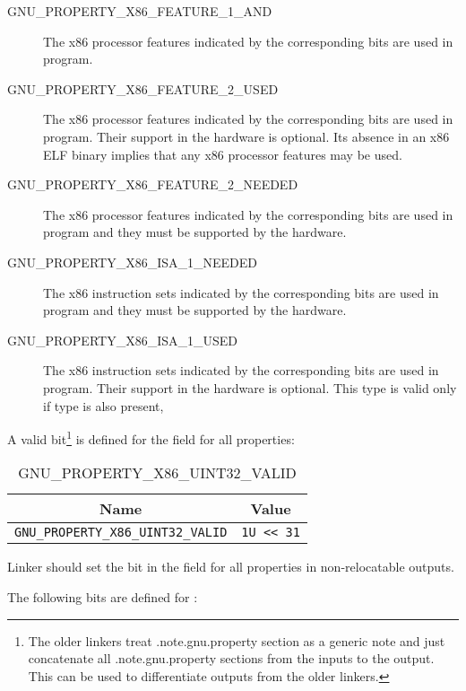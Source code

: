 \begin{description}
 \item[GNU_PROPERTY_X86_FEATURE_1_AND] The x86 processor features
   indicated by the corresponding bits are used in program.
 \item[GNU_PROPERTY_X86_FEATURE_2_USED] The x86 processor features
   indicated by the corresponding bits are used in program.  Their
   support in the hardware is optional.  Its absence in an x86 ELF
   binary implies that any x86 processor features may be used.
 \item[GNU_PROPERTY_X86_FEATURE_2_NEEDED] The x86 processor features
   indicated by the corresponding bits are used in program and they
   must be supported by the hardware.
 \item[GNU_PROPERTY_X86_ISA_1_NEEDED] The x86 instruction sets indicated
   by the corresponding bits are used in program and they must be
   supported by the hardware.
 \item[GNU_PROPERTY_X86_ISA_1_USED] The x86 instruction sets indicated
   by the corresponding bits are used in program.  Their support in the
   hardware is optional.  This type is valid only if
    type is also present,
\end{description}

A valid bit\footnote{The older linkers treat .note.gnu.property section
as a generic note and just concatenate all .note.gnu.property sections
from the inputs to the output. This can be used to differentiate outputs
from the older linkers.} is defined for the  field for all
properties:

\begin{table}[H]
\Hrule
  \caption{GNU_PROPERTY_X86_UINT32_VALID}
  \begin{center}
    \begin{tabular}[t]{l|l}
      \multicolumn{1}{c}{Name} & \multicolumn{1}{c}{Value} \\
      \hline
     \texttt{GNU_PROPERTY_X86_UINT32_VALID} & \texttt{1U << 31} \\
    \end{tabular}
  \end{center}
\Hrule
\end{table}

Linker should set the  bit in
the  field for all properties in non-relocatable outputs.

The following bits are defined for :

